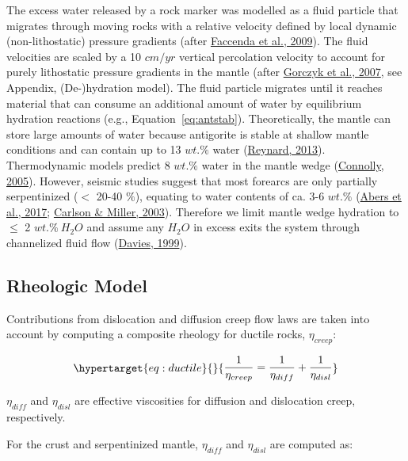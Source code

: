 \documentclass[draft,linenumbers]{agujournal2018}
\begin{document}
The excess water released by a rock marker was modelled as a fluid
particle that migrates through moving rocks with a relative velocity
defined by local dynamic (non-lithostatic) pressure gradients (after
\protect\hyperlink{ref-Faccenda2009}{Faccenda et al., 2009}). The fluid
velocities are scaled by a 10 \(cm/yr\) vertical percolation velocity to
account for purely lithostatic pressure gradients in the mantle (after
\protect\hyperlink{ref-Gorczyk2007}{Gorczyk et al., 2007}, see Appendix,
(De-)hydration model). The fluid particle migrates until it reaches
material that can consume an additional amount of water by equilibrium
hydration reactions (e.g., Equation~\ref{eq:antstab}). Theoretically,
the mantle can store large amounts of water because antigorite is stable
at shallow mantle conditions and can contain up to 13 \(wt.\%\) water
(\protect\hyperlink{ref-Reynard2013}{Reynard, 2013}). Thermodynamic
models predict 8 \(wt.\%\) water in the mantle wedge
(\protect\hyperlink{ref-Connolly2005}{Connolly, 2005}). However, seismic
studies suggest that most forearcs are only partially serpentinized
(\(<\) 20-40 \(\%\)), equating to water contents of ca. 3-6 \(wt.\%\)
(\protect\hyperlink{ref-Abers2017}{Abers et al., 2017};
\protect\hyperlink{ref-Carlson2003}{Carlson \& Miller, 2003}). Therefore
we limit mantle wedge hydration to \(\leq\) 2 \(wt.\%\ H_{2}O\) and
assume any \(H_{2}O\) in excess exits the system through channelized
fluid flow (\protect\hyperlink{ref-Davies1999}{Davies, 1999}).

\hypertarget{rheologic-model}{%
\subsection{Rheologic Model}\label{rheologic-model}}

Contributions from dislocation and diffusion creep flow laws are taken
into account by computing a composite rheology for ductile rocks,
\(\eta_{creep}\):

\begin{equation}\protect\hypertarget{eq:ductile}{}{\begin{aligned}\frac{1}{\eta_{creep}} = \frac{1}{\eta_{diff}} + \frac{1}{\eta_{disl}}\end{aligned}}\label{eq:ductile}\end{equation}

\(\eta_{diff}\) and \(\eta_{disl}\) are effective viscosities for
diffusion and dislocation creep, respectively.

For the crust and serpentinized mantle, \(\eta_{diff}\) and
\(\eta_{disl}\) are computed as:
\end{document}
